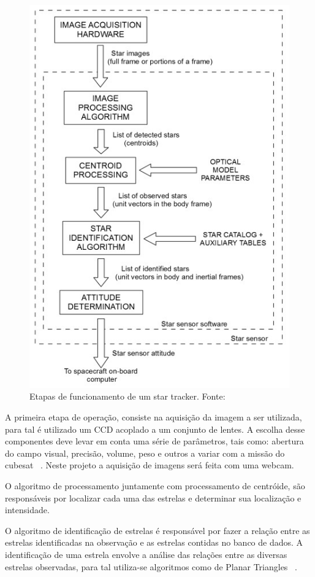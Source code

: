\begin{figure}[!h]
	\centering
	\includegraphics[width=.7\columnwidth]{images/etapas.jpg}
	\caption{Etapas de funcionamento de um star tracker. Fonte: ~\cite[]{Fialho}}
	\label{fig:etapas_star_trackers}
\end{figure}

A primeira etapa de operação, consiste  na aquisição da imagem a ser utilizada, para tal é utilizado um CCD acoplado a um conjunto de lentes. A escolha desse componentes deve levar em conta uma série de parâmetros, tais como: abertura do campo visual, precisão, volume, peso e outros a variar com a  missão do cubesat ~\cite[]{Carvalho}. Neste projeto a aquisição de imagens será feita com uma webcam.

O algoritmo de processamento juntamente com processamento de centróide, são responsáveis por localizar cada uma das estrelas e determinar sua localização e intensidade.

O algoritmo de identificação de estrelas é responsável por fazer a relação entre as estrelas identificadas na observação e as estrelas contidas no banco de dados. A identificação de uma estrela envolve a análise das relações entre as diversas estrelas observadas, para tal utiliza-se algoritmos como de  Planar Triangles ~\cite[]{Cole}.

